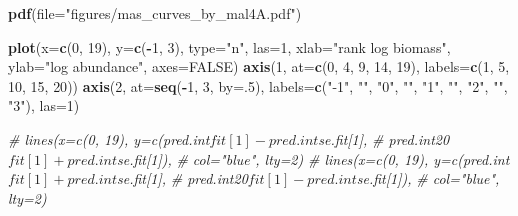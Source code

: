 \documentclass[]{article}
\newenvironment{Shaded}{\begin{snugshade}}{\end{snugshade}}
\newcommand{\KeywordTok}[1]{\textcolor[rgb]{0.13,0.29,0.53}{\textbf{#1}}}
\newcommand{\DataTypeTok}[1]{\textcolor[rgb]{0.13,0.29,0.53}{#1}}
\newcommand{\DecValTok}[1]{\textcolor[rgb]{0.00,0.00,0.81}{#1}}
\newcommand{\StringTok}[1]{\textcolor[rgb]{0.31,0.60,0.02}{#1}}
\newcommand{\CommentTok}[1]{\textcolor[rgb]{0.56,0.35,0.01}{\textit{#1}}}
\newcommand{\OtherTok}[1]{\textcolor[rgb]{0.56,0.35,0.01}{#1}}
\newcommand{\OperatorTok}[1]{\textcolor[rgb]{0.81,0.36,0.00}{\textbf{#1}}}
\newcommand{\NormalTok}[1]{#1}
\begin{document}
\begin{Shaded}
\begin{Highlighting}[]
\KeywordTok{pdf}\NormalTok{(}\DataTypeTok{file=}\StringTok{"figures/mas_curves_by_mal4A.pdf"}\NormalTok{)}

\KeywordTok{plot}\NormalTok{(}\DataTypeTok{x=}\KeywordTok{c}\NormalTok{(}\DecValTok{0}\NormalTok{, }\DecValTok{19}\NormalTok{), }\DataTypeTok{y=}\KeywordTok{c}\NormalTok{(}\OperatorTok{-}\DecValTok{1}\NormalTok{, }\DecValTok{3}\NormalTok{), }\DataTypeTok{type=}\StringTok{"n"}\NormalTok{, }\DataTypeTok{las=}\DecValTok{1}\NormalTok{,}
     \DataTypeTok{xlab=}\StringTok{"rank log biomass"}\NormalTok{, }\DataTypeTok{ylab=}\StringTok{"log abundance"}\NormalTok{, }\DataTypeTok{axes=}\OtherTok{FALSE}\NormalTok{)}
\KeywordTok{axis}\NormalTok{(}\DecValTok{1}\NormalTok{, }\DataTypeTok{at=}\KeywordTok{c}\NormalTok{(}\DecValTok{0}\NormalTok{, }\DecValTok{4}\NormalTok{, }\DecValTok{9}\NormalTok{, }\DecValTok{14}\NormalTok{, }\DecValTok{19}\NormalTok{), }\DataTypeTok{labels=}\KeywordTok{c}\NormalTok{(}\DecValTok{1}\NormalTok{, }\DecValTok{5}\NormalTok{, }\DecValTok{10}\NormalTok{, }\DecValTok{15}\NormalTok{, }\DecValTok{20}\NormalTok{))}
\KeywordTok{axis}\NormalTok{(}\DecValTok{2}\NormalTok{, }\DataTypeTok{at=}\KeywordTok{seq}\NormalTok{(}\OperatorTok{-}\DecValTok{1}\NormalTok{, }\DecValTok{3}\NormalTok{, }\DataTypeTok{by=}\NormalTok{.}\DecValTok{5}\NormalTok{), }
     \DataTypeTok{labels=}\KeywordTok{c}\NormalTok{(}\StringTok{"-1"}\NormalTok{, }\StringTok{""}\NormalTok{, }\StringTok{"0"}\NormalTok{, }\StringTok{""}\NormalTok{, }\StringTok{"1"}\NormalTok{, }\StringTok{""}\NormalTok{, }\StringTok{"2"}\NormalTok{, }\StringTok{""}\NormalTok{, }\StringTok{"3"}\NormalTok{), }\DataTypeTok{las=}\DecValTok{1}\NormalTok{)}

\CommentTok{# lines(x=c(0, 19), y=c(pred.int$fit[1]-pred.int$se.fit[1], }
\CommentTok{#                       pred.int20$fit[1]+pred.int$se.fit[1]),}
\CommentTok{#       col="blue", lty=2)}
\CommentTok{# lines(x=c(0, 19), y=c(pred.int$fit[1]+pred.int$se.fit[1], }
\CommentTok{#                       pred.int20$fit[1]-pred.int$se.fit[1]),}
\CommentTok{#       col="blue", lty=2)}


\end{Highlighting}
\end{Shaded}
\end{document}
